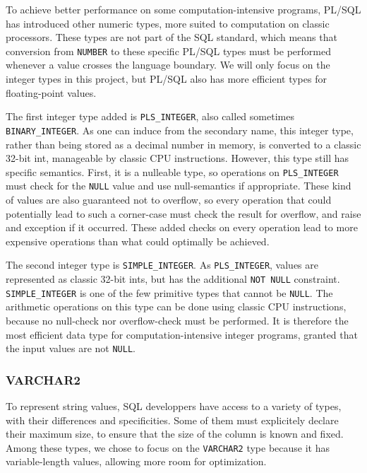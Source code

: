\documentclass[twoside,11pt,a4paper]{article}
\newcommand{\pls}[1]{\small\texttt{#1}\normalsize}
\newcommand{\plstype}[1]{\pls{#1}}
\newcommand{\varchar}{\plstype{VARCHAR2}}
\newcommand{\oranum}{\plstype{NUMBER}}
\newcommand{\plsi}{\plstype{PLS\_INTEGER}}
\newcommand{\simpleint}{\plstype{SIMPLE\_INTEGER}}
\newcommand{\plsnull}{\pls{NULL}}
\begin{document}
 
To achieve better performance on some computation-intensive programs, PL/SQL has introduced other numeric types, more suited to computation on classic processors. These types are not part of the SQL standard, which means that conversion from \oranum{} to these specific PL/SQL types must be performed whenever a value crosses the language boundary. We will only focus on the integer types in this project, but PL/SQL also has more efficient types for floating-point values.

The first integer type added is \plsi{}, also called sometimes \plstype{BINARY\_INTEGER}. As one can induce from the secondary name, this integer type, rather than being stored as a decimal number in memory, is converted to a classic 32-bit int, manageable by classic CPU instructions. However, this type still has specific semantics. First, it is a nulleable type, so operations on \plsi{} must check for the \plsnull{} value and use null-semantics if appropriate. These kind of values are also guaranteed not to overflow, so every operation that could potentially lead to such a corner-case must check the result for overflow, and raise and exception if it occurred. These added checks on every operation lead to more expensive operations than what could optimally be achieved.

The second integer type is \simpleint{}. As \plsi{}, values are represented as classic 32-bit ints, but has the additional \pls{NOT NULL} constraint. \simpleint{} is one of the few primitive types that cannot be \plsnull{}. The arithmetic operations on this type can be done using classic CPU instructions, because no null-check nor overflow-check must be performed. It is therefore the most efficient data type for computation-intensive integer programs, granted that the input values are not \plsnull{}.

\subsubsection{VARCHAR2}

To represent string values, SQL developpers have access to a variety of types, with their differences and specificities. Some of them must explicitely declare their maximum size, to ensure that the size of the column is known and fixed. Among these types, we chose to focus on the \varchar{} type because it has variable-length values, allowing more room for optimization.
\end{document}
